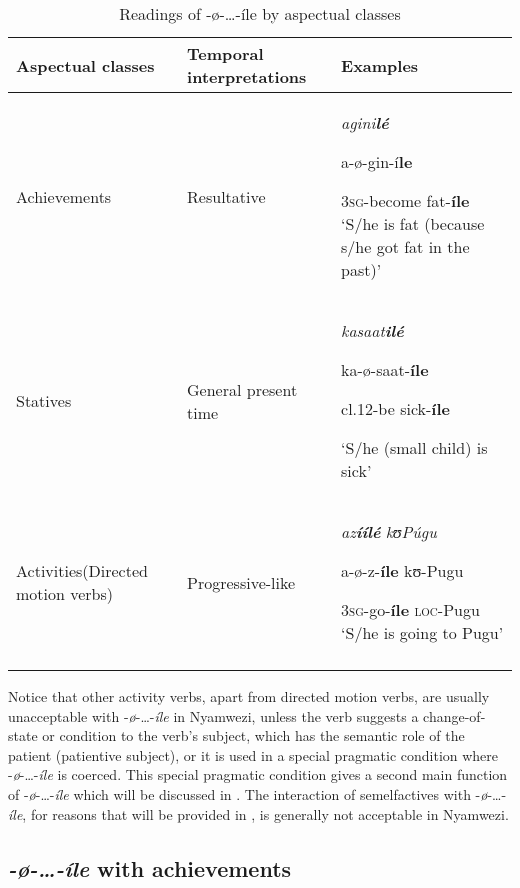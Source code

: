 \documentclass[output=paper,newtxmath,modfonts,nonflat,draftmode]{langsci/langscibook}
\begin{document}
\begin{table}
\caption{Readings of -ø-…-íle by aspectual classes}
\label{tab:kanijo:2}
\begin{tabularx}{\textwidth}{QQp{39mm}}
\lsptoprule
\bfseries Aspectual classes & \bfseries Temporal interpretations & \bfseries Examples \\
\midrule 
Achievements & Resultative & \textit{agini}\textbf{\textit{lé}} 

a-ø-gin-í\textbf{le} 

3\textsc{sg}-become fat-\textbf{íle} 
‘S/he is fat (because s/he got fat in the past)’\\

\tablevspace
Statives & General present time & \textit{kasaat}\textbf{\textit{i}}\textbf{\textit{lé}} 

ka\footnotemark{}-ø-saat-\textbf{íle} 

cl.12-be sick-\textbf{íle}

‘S/he (small child) is sick’\\

\tablevspace
Activities\newline (Directed motion verbs) & Progressive-like & \textit{az}\textbf{\textit{íílé}         }\textit{kʊ}\textit{Púgu}

a-ø-z-\textbf{íle}    kʊ-Pugu

3\textsc{sg}-go-\textbf{íle} \textsc{loc}-Pugu 
‘S/he is going to Pugu’\\
\lspbottomrule
\end{tabularx}
\end{table} 


Notice that other activity verbs, apart from directed motion verbs, are usually unacceptable with -\textit{ø}-…-\textit{íle} in Nyamwezi, unless the verb suggests a change-of-state or condition to the verb’s subject, which has the semantic role of the patient (patientive subject), or it is used in a special pragmatic condition where -\textit{ø}-…-\textit{íle} is coerced. This special pragmatic condition gives a second main function of -\textit{ø}-…-\textit{íle} which will be discussed in . The interaction of semelfactives with -\textit{ø}-…-\textit{íle}, for reasons that will be provided in , is generally not acceptable in Nyamwezi. 
 
\subsection{\textit{-}\textit{ø-\ldots-íle} with achievements}
\end{document}
